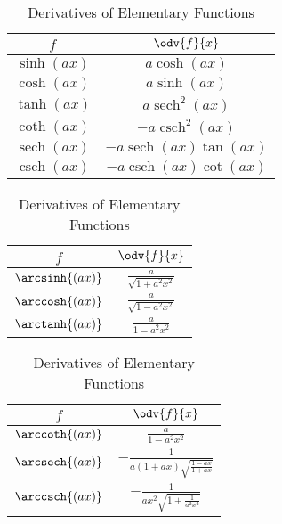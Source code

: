 \documentclass{article}
\DeclareMathOperator{\sech}{sech}
\DeclareMathOperator{\csch}{csch}
\begin{document}
\begin{table}[H]
    \renewcommand*{\arraystretch}{1.5}
    \centering
    \hspace*{-1cm}
    \begin{tabular}{c c}
        \toprule
        \(f\)                        & \(\odv{f}{x}\)                                        \\
        \midrule
        \(\sinh{\left( ax \right)}\) & \(a\cosh{\left( ax \right)}\)                         \\
        \(\cosh{\left( ax \right)}\) & \(a\sinh{\left( ax \right)}\)                         \\
        \(\tanh{\left( ax \right)}\) & \(a\sech^2{\left( ax \right)}\)                       \\
        \(\coth{\left( ax \right)}\) & \(-a\csch^2{\left( ax \right)}\)                      \\
        \(\sech{\left( ax \right)}\) & \(-a\sech{\left( ax \right)}\tan{\left( ax \right)}\) \\
        \(\csch{\left( ax \right)}\) & \(-a\csch{\left( ax \right)}\cot{\left( ax \right)}\) \\[5pt]
        \bottomrule
    \end{tabular}
    \begin{tabular}{c c}
        \toprule
        \(f\)                           & \(\odv{f}{x}\)                              \\
        \midrule
        \(\arcsinh{\left( ax \right)}\) & \(\displaystyle \frac{a}{\sqrt{1+a^2x^2}}\) \\[8pt]
        \(\arccosh{\left( ax \right)}\) & \(\displaystyle \frac{a}{\sqrt{1-a^2x^2}}\) \\[8pt]
        \(\arctanh{\left( ax \right)}\) & \(\displaystyle \frac{a}{1-a^2x^2}\)        \\[8pt]
        \bottomrule
    \end{tabular}
    \begin{tabular}{c c}
        \toprule
        \(f\)                           & \(\odv{f}{x}\)                                                            \\
        \midrule
        \(\arccoth{\left( ax \right)}\) & \(\displaystyle  \frac{a}{1-a^2x^2}\)                                     \\[8pt]
        \(\arcsech{\left( ax \right)}\) & \(\displaystyle -\frac{1}{a\left( 1+ax \right)\sqrt{\frac{1-ax}{1+ax}}}\) \\[8pt]
        \(\arccsch{\left( ax \right)}\) & \(\displaystyle -\frac{1}{ax^2\sqrt{1+\frac{1}{a^2x^2}}}\)                \\[8pt]
        \bottomrule
    \end{tabular}
    \hspace*{-1cm}
    \caption{Derivatives of Elementary Functions}
\end{table}
\end{document}
